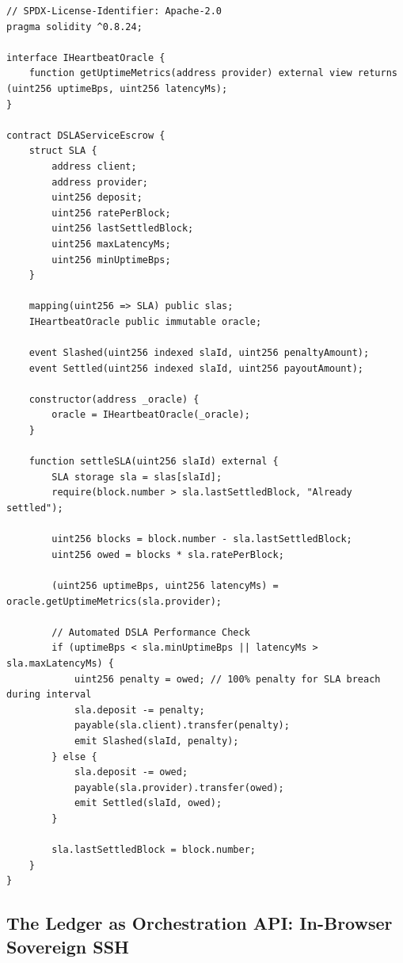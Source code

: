 \documentclass[a4paper,11pt,twoside,parskip=half-,headings=small]{scrartcl}
\newcommand{\code}[1]{\texttt{#1}}
\begin{document}
\begin{lstlisting}[language=Solidity,caption={Solidity Smart Contract: Dynamic SLA Escrow with Oracle-Enforced Slashing (\code{contracts/src/DSLAServiceEscrow.sol})}]
// SPDX-License-Identifier: Apache-2.0
pragma solidity ^0.8.24;

interface IHeartbeatOracle {
    function getUptimeMetrics(address provider) external view returns (uint256 uptimeBps, uint256 latencyMs);
}

contract DSLAServiceEscrow {
    struct SLA {
        address client;
        address provider;
        uint256 deposit;
        uint256 ratePerBlock;
        uint256 lastSettledBlock;
        uint256 maxLatencyMs;
        uint256 minUptimeBps;
    }

    mapping(uint256 => SLA) public slas;
    IHeartbeatOracle public immutable oracle;

    event Slashed(uint256 indexed slaId, uint256 penaltyAmount);
    event Settled(uint256 indexed slaId, uint256 payoutAmount);

    constructor(address _oracle) {
        oracle = IHeartbeatOracle(_oracle);
    }

    function settleSLA(uint256 slaId) external {
        SLA storage sla = slas[slaId];
        require(block.number > sla.lastSettledBlock, "Already settled");

        uint256 blocks = block.number - sla.lastSettledBlock;
        uint256 owed = blocks * sla.ratePerBlock;

        (uint256 uptimeBps, uint256 latencyMs) = oracle.getUptimeMetrics(sla.provider);

        // Automated DSLA Performance Check
        if (uptimeBps < sla.minUptimeBps || latencyMs > sla.maxLatencyMs) {
            uint256 penalty = owed; // 100% penalty for SLA breach during interval
            sla.deposit -= penalty;
            payable(sla.client).transfer(penalty);
            emit Slashed(slaId, penalty);
        } else {
            sla.deposit -= owed;
            payable(sla.provider).transfer(owed);
            emit Settled(slaId, owed);
        }

        sla.lastSettledBlock = block.number;
    }
}
\end{lstlisting}

\subsection{The Ledger as Orchestration API: In-Browser Sovereign SSH}
\label{sec:sovereign_ssh}
\end{document}
